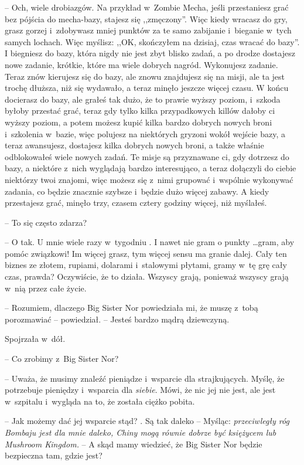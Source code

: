 \documentclass[oneside,polish,11pt,rmheadings]{mwbk}
\begin{document}
-- Och, wiele drobiazgów. Na przykład w~Zombie Mecha, jeśli przestaniesz grać bez pójścia do mecha-bazy, stajesz się ,,zmęczony''. Więc kiedy wracasz do gry, grasz gorzej i~zdobywasz mniej punktów za te samo zabijanie i~bieganie w~tych samych lochach. Więc myślisz: ,,OK, skończyłem na dzisiaj, czas wracać do bazy''. I biegniesz do bazy, która nigdy nie jest zbyt blisko zadań, a po drodze dostajesz nowe zadanie, krótkie, które ma wiele dobrych nagród. Wykonujesz zadanie. Teraz znów kierujesz się do bazy, ale znowu znajdujesz się na misji, ale ta jest trochę dłuższa, niż się wydawało, a teraz minęło jeszcze więcej czasu. W końcu docierasz do bazy, ale grałeś tak dużo, że to prawie wyższy poziom, i~szkoda byłoby przestać grać, teraz gdy tylko kilka przypadkowych killów dałoby ci wyższy poziom, a potem możesz kupić kilka bardzo dobrych nowych broni i~szkolenia w~bazie, więc polujesz na niektórych gryzoni wokół wejście bazy, a teraz awansujesz, dostajesz kilka dobrych nowych broni, a także właśnie odblokowałeś wiele nowych zadań. Te misje są przyznawane ci, gdy dotrzesz do bazy, a niektóre z~nich wyglądają bardzo interesująco, a teraz dołączyli do ciebie niektórzy twoi znajomi, więc możesz się z~nimi grupować i~wspólnie wykonywać zadania, co będzie znacznie szybsze i~będzie dużo więcej zabawy. A kiedy przestajesz grać, minęło trzy, czasem cztery godziny więcej, niż myślałeś. 

-- To się często zdarza? 

-- O tak. U mnie wiele razy w~tygodniu . I nawet nie gram o punkty  \ldots  gram, aby pomóc związkowi! Im więcej grasz, tym więcej sensu ma granie dalej. Cały ten biznes ze złotem, rupiami, dolarami i~stalowymi płytami, gramy w~tę grę cały czas, prawda? Oczywiście, że to działa. Wszyscy grają, ponieważ wszyscy grają w~nią przez całe życie.

-- Rozumiem, dlaczego Big Sister Nor powiedziała mi, że muszę z~tobą porozmawiać -- powiedział. -- Jesteś bardzo mądrą dziewczyną.

Spojrzała w~dół.

-- Co zrobimy z~Big Sister Nor?

-- Uważa, że musimy znaleźć pieniądze i~wsparcie dla strajkujących. Myślę, że potrzebuje pieniędzy i~wsparcia dla \textit{siebie}. Mówi, że nic jej nie jest, ale jest w~szpitalu i~wygląda na to, że została ciężko pobita.

-- Jak możemy dać jej wsparcie stąd? . Są tak daleko -- Myśląc: \textit{przeciwległy róg Bombaju jest dla mnie daleko, Chiny mogą równie dobrze być księżycem lub Mushroom Kingdom.} -- A skąd mamy wiedzieć, że Big Sister Nor będzie bezpieczna tam, gdzie jest?
\end{document}
